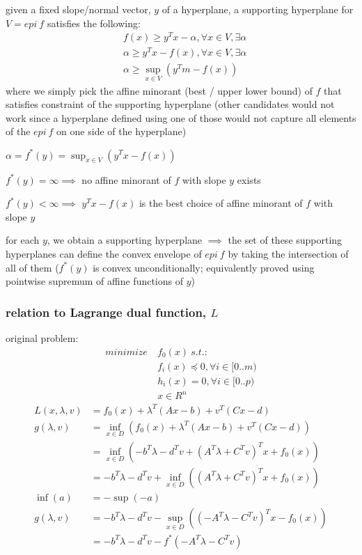 \documentclass[8pt]{extarticle}
\begin{document}
\begin{multicols*}{2}
  given a fixed slope/normal vector, $y$ of a hyperplane, a supporting hyperplane for $V = epi\ f$ satisfies the following:
  \begin{align*}
    &f(x) \geq y^T x - \alpha, \forall x \in V, \exists \alpha\\
    &\alpha \geq y^T x - f(x), \forall x \in V, \exists \alpha\\
    &\alpha \geq \sup_{x \in V} (y^T m - f(x))
  \end{align*}
  where we simply pick the affine minorant (best / upper lower bound) of $f$ that satisfies constraint of the supporting hyperplane (other candidates would not work since a hyperplane defined using one of those would not capture all elements of the $epi\ f$ on one side of the hyperplane)

  $\alpha = f^*(y) = \sup_{x \in V}(y^T x - f(x))$

  $f^*(y) = \infty \implies$ no affine minorant of $f$ with slope $y$ exists
  
  $f^*(y) < \infty \implies$ $y^T x - f(x)$ is the best choice of affine minorant of $f$ with slope $y$

  for each $y$, we obtain a supporting hyperplane $\implies$ the set of these supporting hyperplanes can define the convex envelope of $epi\ f$ by taking the intersection of all of them ($f^*(y)$ is convex unconditionally; equivalently proved using pointwise supremum of affine functions of $y$)
  
  \subsubsection{relation to Lagrange dual function, $L$}

  original problem:
  \begin{align*}
    minimize\ &f_0(x)\ s.t.:\\
    &f_i(x) \preceq 0, \forall i \in [0..m)\\
    &h_i(x) = 0, \forall i \in [0..p)\\
    &x \in R^n
  \end{align*}
  \begin{align*}
    L(x, \lambda, v) &= f_0(x) + \lambda^T(Ax-b) + v^T(Cx-d)\\
    g(\lambda, v) &= \inf_{x \in D}(f_0(x) + \lambda^T(Ax-b) + v^T(Cx-d))\\
                    &= \inf_{x \in D}(-b^T \lambda -d^T v + (A^T\lambda + C^Tv)^T x + f_0(x))\\
                    &= -b^T \lambda -d^T v + \inf_{x \in D}((A^T\lambda + C^Tv)^T x + f_0(x))\\
    \inf(a) &= - \sup(-a)\\
    g(\lambda, v) &= -b^T \lambda -d^T v -\sup_{x \in D}((-A^T\lambda - C^Tv)^T x - f_0(x))\\
                    &= -b^T \lambda -d^T v - f^*(-A^T\lambda - C^Tv)
  \end{align*}


\end{multicols*}
\end{document}
